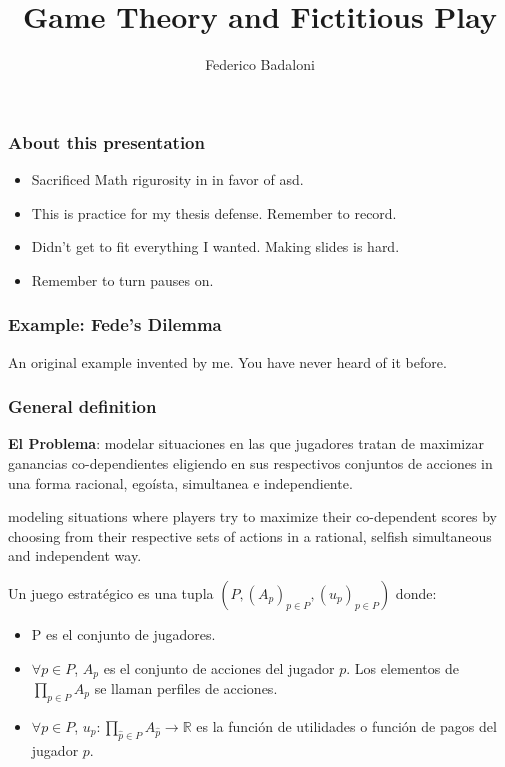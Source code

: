 \documentclass[pdf]{beamer}
\title{Game Theory and Fictitious Play}
\author[]{Federico Badaloni}
\begin{document}
\begin{frame}
    \frametitle{About this presentation}
    \begin{itemize}
        \item Sacrificed Math rigurosity in in favor of asd.
        \item This is practice for my thesis defense. Remember to record.
        \item Didn't get to fit everything I wanted. Making slides is hard.
        \item \pause Remember to turn pauses on.
    \end{itemize}

\end{frame}

\begin{frame}
    \frametitle{Example: Fede's Dilemma}
    An original example invented by me. You have never heard of it before.

\end{frame}

\begin{frame}
    \frametitle{General definition}
    \textbf{El Problema}: modelar situaciones en las que jugadores tratan de maximizar ganancias co-dependientes eligiendo en sus respectivos conjuntos de acciones in una forma racional, egoísta, simultanea e independiente. 
    
    modeling situations where players try to maximize their co-dependent scores by choosing from their respective
    sets of actions in a rational, selfish simultaneous and independent way.
    
    \pause
    \begin{definition}
        Un juego estratégico es una tupla $(P, (A_p)_{p \in P}, (u_p)_{p \in P})$ donde:
        \begin{itemize}
            \item P es el conjunto de jugadores.
            \item $\forall p \in P$, $A_p$ es el conjunto de acciones del jugador $p$. Los elementos de $\prod\limits_{p \in P} A_p$ se llaman perfiles de acciones.
            \item $\forall p \in P$, $u_p: \prod\limits_{\widehat{p} \in P} A_{\widehat{p}} \rightarrow \mathbb{R}$ es la función de utilidades o función de pagos del jugador $p$.
        \end{itemize}
    \end{definition}

\end{frame}
\end{document}
